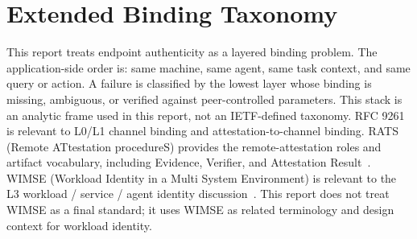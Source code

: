 \documentclass[11pt,a4paper]{article}
\begin{document}
\appendix
\renewcommand{\thesection}{\Alph{section}}
\renewcommand{\thesubsection}{\thesection.\arabic{subsection}}
\titleformat{\section}{\normalfont\Large\bfseries}{Appendix \thesection:}{1em}{}
\newpage
\section{Extended Binding Taxonomy}
\label{app:binding-taxonomy}

This report treats endpoint authenticity as a layered binding problem. The
application-side order is: same machine, same agent, same task context, and
same query or action. A failure is classified by the lowest layer whose
binding is missing, ambiguous, or verified against peer-controlled parameters.
This stack is an analytic frame used in this report, not an IETF-defined
taxonomy. RFC 9261 is relevant to L0/L1 channel binding and
attestation-to-channel binding. RATS (Remote ATtestation procedureS) provides
the remote-attestation roles and artifact vocabulary, including Evidence,
Verifier, and Attestation Result~\cite{rfc9334}. WIMSE (Workload Identity in a
Multi System Environment) is relevant to the L3 workload / service / agent
identity discussion~\cite{wimse-arch}. This report does not treat WIMSE as a
final standard; it uses WIMSE as related terminology and design context for
workload identity.
\end{document}
